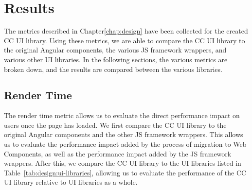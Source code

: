 \chapter{Results}\label{chap:results}
The metrics described in Chapter\ref{chap:design} have been collected for the created CC UI library. Using these metrics, we are able to compare the CC UI library to the original Angular components, the various JS framework wrappers, and various other UI libraries. In the following sections, the various metrics are broken down, and the results are compared between the various libraries.

\section{Render Time}
The render time metric allows us to evaluate the direct performance impact on users once the page has loaded. We first compare the CC UI library to the original Angular components and the other JS framework wrappers. This allows us to evaluate the performance impact added by the process of migration to Web Components, as well as the performance impact added by the JS framework wrappers. After this, we compare the CC UI library to the UI libraries listed in Table~\ref{tab:design:ui-libraries}, allowing us to evaluate the performance of the CC UI library relative to UI libraries as a whole.


